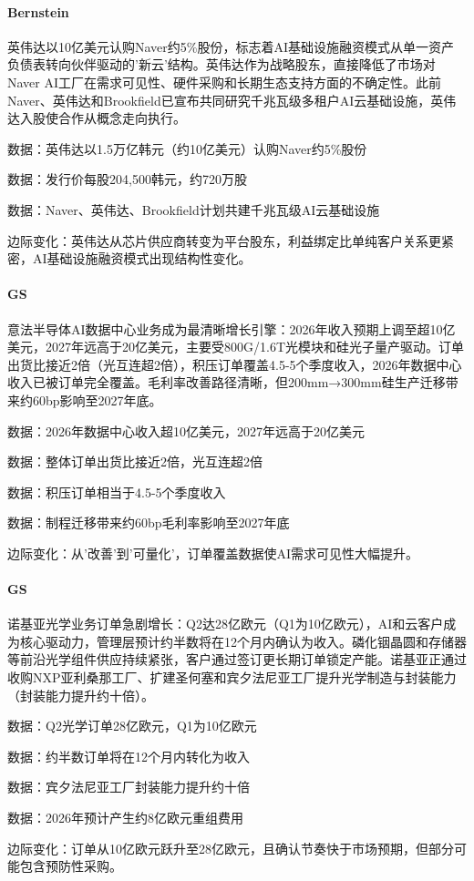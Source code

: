\documentclass[11pt]{ctexart}
\begin{document}
\paragraph{Bernstein} 英伟达以10亿美元认购Naver约5\%股份，标志着AI基础设施融资模式从单一资产负债表转向伙伴驱动的'新云'结构。英伟达作为战略股东，直接降低了市场对Naver AI工厂在需求可见性、硬件采购和长期生态支持方面的不确定性。此前Naver、英伟达和Brookfield已宣布共同研究千兆瓦级多租户AI云基础设施，英伟达入股使合作从概念走向执行。
{\small\color{refgray}数据：英伟达以1.5万亿韩元（约10亿美元）认购Naver约5\%股份\par}
{\small\color{refgray}数据：发行价每股204,500韩元，约720万股\par}
{\small\color{refgray}数据：Naver、英伟达、Brookfield计划共建千兆瓦级AI云基础设施\par}
{\small\color{refgray}边际变化：英伟达从芯片供应商转变为平台股东，利益绑定比单纯客户关系更紧密，AI基础设施融资模式出现结构性变化。\par}
\paragraph{GS} 意法半导体AI数据中心业务成为最清晰增长引擎：2026年收入预期上调至超10亿美元，2027年远高于20亿美元，主要受800G/1.6T光模块和硅光子量产驱动。订单出货比接近2倍（光互连超2倍），积压订单覆盖4.5-5个季度收入，2026年数据中心收入已被订单完全覆盖。毛利率改善路径清晰，但200mm→300mm硅生产迁移带来约60bp影响至2027年底。
{\small\color{refgray}数据：2026年数据中心收入超10亿美元，2027年远高于20亿美元\par}
{\small\color{refgray}数据：整体订单出货比接近2倍，光互连超2倍\par}
{\small\color{refgray}数据：积压订单相当于4.5-5个季度收入\par}
{\small\color{refgray}数据：制程迁移带来约60bp毛利率影响至2027年底\par}
{\small\color{refgray}边际变化：从'改善'到'可量化'，订单覆盖数据使AI需求可见性大幅提升。\par}
\paragraph{GS} 诺基亚光学业务订单急剧增长：Q2达28亿欧元（Q1为10亿欧元），AI和云客户成为核心驱动力，管理层预计约半数将在12个月内确认为收入。磷化铟晶圆和存储器等前沿光学组件供应持续紧张，客户通过签订更长期订单锁定产能。诺基亚正通过收购NXP亚利桑那工厂、扩建圣何塞和宾夕法尼亚工厂提升光学制造与封装能力（封装能力提升约十倍）。
{\small\color{refgray}数据：Q2光学订单28亿欧元，Q1为10亿欧元\par}
{\small\color{refgray}数据：约半数订单将在12个月内转化为收入\par}
{\small\color{refgray}数据：宾夕法尼亚工厂封装能力提升约十倍\par}
{\small\color{refgray}数据：2026年预计产生约8亿欧元重组费用\par}
{\small\color{refgray}边际变化：订单从10亿欧元跃升至28亿欧元，且确认节奏快于市场预期，但部分可能包含预防性采购。\par}
\end{document}
